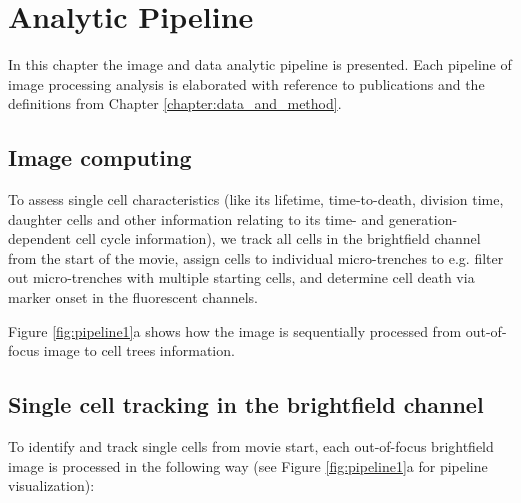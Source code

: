 \documentclass[pdftex,12pt,a4paper]{report}
\begin{document}
\chapter{Analytic Pipeline}


In this chapter the image and data analytic pipeline is presented. Each pipeline of image processing analysis is elaborated with reference to publications and the definitions from Chapter \ref{chapter:data_and_method}.

\section{Image computing}

To assess single cell characteristics (like its lifetime, time-to-death, division time, daughter cells and other information relating to its time- and generation-dependent cell cycle information), we track all cells in the brightfield channel from the start of the movie, assign cells to individual micro-trenches to e.g. filter out micro-trenches with multiple starting cells, and determine cell death via marker onset in the fluorescent channels.

Figure \ref{fig:pipeline1}a shows how the image is sequentially processed from out-of-focus image to cell trees information.

\section{Single cell tracking in the brightfield channel}

To identify and track single cells from movie start, each out-of-focus brightfield image is processed in the following way (see Figure \ref{fig:pipeline1}a for pipeline visualization): 
\end{document}
